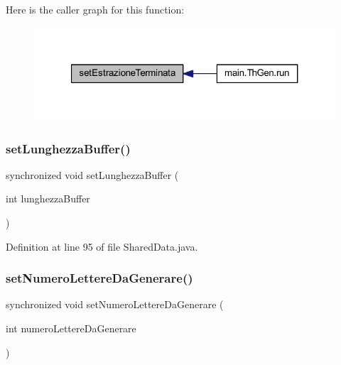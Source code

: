 Here is the caller graph for this function\+:
\nopagebreak
\begin{figure}[H]
\begin{center}
\leavevmode
\includegraphics[width=321pt]{classmain_1_1_shared_data_a7e4be6ed2e568675410bd1666d4bad43_icgraph}
\end{center}
\end{figure}
\mbox{\label{classmain_1_1_shared_data_a9f4674222bb12c6275156d82033cf17c}} 
\subsubsection{\texorpdfstring{set\+Lunghezza\+Buffer()}{setLunghezzaBuffer()}}
{\footnotesize\ttfamily synchronized void set\+Lunghezza\+Buffer (\begin{DoxyParamCaption}\item[{int}]{lunghezza\+Buffer }\end{DoxyParamCaption})}



Definition at line 95 of file Shared\+Data.\+java.

\mbox{\label{classmain_1_1_shared_data_a9f3f5eba6133dccc829f4e67b23cdfae}} 
\subsubsection{\texorpdfstring{set\+Numero\+Lettere\+Da\+Generare()}{setNumeroLettereDaGenerare()}}
{\footnotesize\ttfamily synchronized void set\+Numero\+Lettere\+Da\+Generare (\begin{DoxyParamCaption}\item[{int}]{numero\+Lettere\+Da\+Generare }\end{DoxyParamCaption})}




